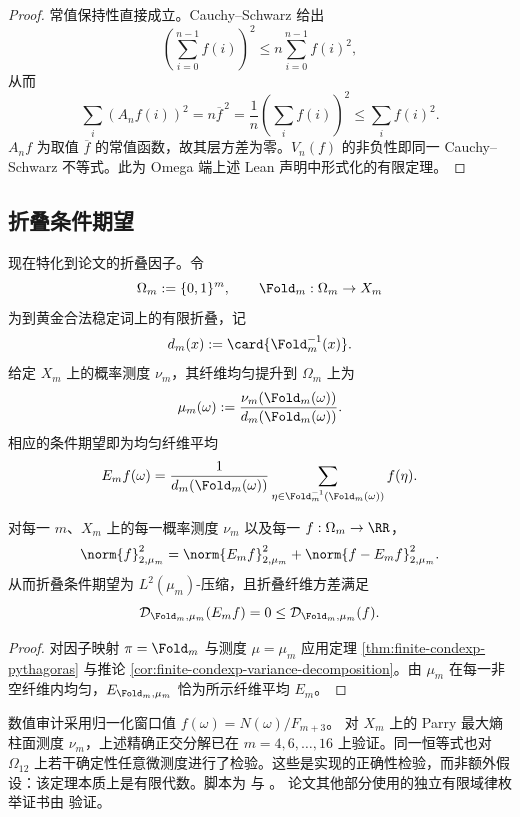 \documentclass[../../main.tex]{subfiles}
\begin{document}
\begin{proof}
常值保持性直接成立。Cauchy--Schwarz 给出
\[
    \left(\sum_{i=0}^{n-1}f(i)\right)^2
    \leq
    n\sum_{i=0}^{n-1}f(i)^2,
\]
从而
\[
    \sum_i(A_nf(i))^2=n\overline f^{\,2}
    =
    \frac{1}{n}\left(\sum_i f(i)\right)^2
    \leq
    \sum_i f(i)^2 .
\]
\(A_nf\) 为取值 \(\overline f\) 的常值函数，故其层方差为零。\(V_n(f)\) 的非负性即同一 Cauchy--Schwarz 不等式。此为 Omega 端上述 Lean 声明中形式化的有限定理。
\end{proof}

\subsection{折叠条件期望}

现在特化到论文的折叠因子。令
\[
    \Omega_m:=\{0,1\}^m,
    \qquad
    \Fold_m:\Omega_m\to X_m
\]
为到黄金合法稳定词上的有限折叠，记
\[
    d_m(x):=\card{\Fold_m^{-1}(x)}.
\]
给定 \(X_m\) 上的概率测度 \(\nu_m\)，其纤维均匀提升到 \(\Omega_m\) 上为
\[
    \mu_m(\omega):=
    \frac{\nu_m(\Fold_m(\omega))}{d_m(\Fold_m(\omega))}.
\]
相应的条件期望即为均匀纤维平均
\[
    E_mf(\omega)
    =
    \frac{1}{d_m(\Fold_m(\omega))}
    \sum_{\eta\in \Fold_m^{-1}(\Fold_m(\omega))}f(\eta).
\]

\begin{proposition}[折叠 \(L^2\) 分解]\label{prop:fold-condexp-l2-decomposition}
对每一 \(m\)、\(X_m\) 上的每一概率测度 \(\nu_m\) 以及每一 \(f:\Omega_m\to\RR\)，
\[
    \norm{f}_{2,\mu_m}^2
    =
    \norm{E_mf}_{2,\mu_m}^2
    +
    \norm{f-E_mf}_{2,\mu_m}^2 .
\]
从而折叠条件期望为 \(L^2(\mu_m)\)-压缩，且折叠纤维方差满足
\[
    \mathcal D_{\Fold_m,\mu_m}(E_mf)=0\leq
    \mathcal D_{\Fold_m,\mu_m}(f).
\]
\end{proposition}

\begin{proof}
对因子映射 \(\pi=\Fold_m\) 与测度 \(\mu=\mu_m\) 应用定理 \ref{thm:finite-condexp-pythagoras} 与推论 \ref{cor:finite-condexp-variance-decomposition}。由 \(\mu_m\) 在每一非空纤维内均匀，\(E_{\Fold_m,\mu_m}\) 恰为所示纤维平均 \(E_m\)。
\end{proof}

数值审计采用归一化窗口值 \(f(\omega)=N(\omega)/F_{m+3}\)。
对 \(X_m\) 上的 Parry 最大熵柱面测度 \(\nu_m\)，上述精确正交分解已在 \(m=4,6,\ldots,16\) 上验证。同一恒等式也对 \(\Omega_{12}\) 上若干确定性任意微测度进行了检验。这些是实现的正确性检验，而非额外假设：该定理本质上是有限代数。脚本为
\texttt{}
与
\texttt{}。
论文其他部分使用的独立有限域律枚举证书由
\texttt{} 验证。
\end{document}
